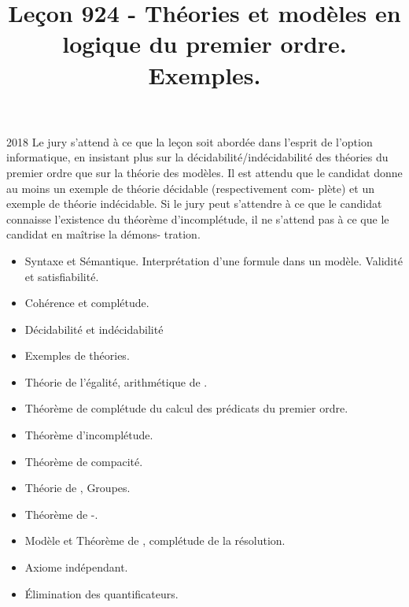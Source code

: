 \documentclass{agregfiche}
\title{Leçon 924 - Théories et modèles en logique du premier ordre.
Exemples.}
\begin{document}
\maketitle

\secrapports
\begin{rapport}{2018}
    Le jury s’attend à ce que la leçon soit abordée dans l’esprit de
    l’option informatique, en insistant plus
    sur la décidabilité/indécidabilité des théories du premier ordre
    que sur la théorie des modèles.
    Il est attendu que le candidat donne au moins un exemple de
    théorie décidable (respectivement com-
    plète) et un exemple de théorie indécidable. Si le jury peut
    s’attendre à ce que le candidat connaisse
    l’existence du théorème d’incomplétude, il ne s’attend pas à ce
    que le candidat en maîtrise la démons-
    tration.
\end{rapport}

\secindispensables

\begin{itemize}
    \item Syntaxe et Sémantique. Interprétation d’une formule dans un
	modèle. Validité et satisfiabilité.
    \item Cohérence et complétude.
    \item Décidabilité et indécidabilité
    \item Exemples de théories.
\end{itemize}





\secasavoir

\begin{itemize}
    \item Théorie de l'égalité, arithmétique de .
    \item  Théorème de complétude du calcul des prédicats du premier
      ordre.
    \item Théorème d'incomplétude.
    \item Théorème de compacité.
\end{itemize}

\secidees

\begin{itemize}
    \item Théorie de , Groupes.
    \item Théorème de -.
    \item Modèle et Théorème de , complétude de la
    résolution.
    \item Axiome indépendant.
    \item Élimination des quantificateurs.
\end{itemize}
\end{document}
